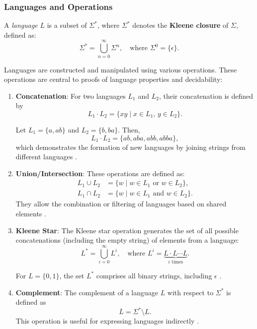 \subsubsection{Languages and Operations}
A \textit{language} $L$ is a subset of $\Sigma^\ast$, where $\Sigma^\ast$ denotes the \textbf{Kleene closure} of $\Sigma$, defined as:
\[
\Sigma^\ast = \bigcup_{n=0}^\infty \Sigma^n, \quad \text{where } \Sigma^0 = \{\epsilon\}.
\]
\cite{kleene1956representation}

Languages are constructed and manipulated using various operations. These operations are central to proofs of language properties and decidability:

\begin{enumerate}
    \item \textbf{Concatenation}: For two languages $L_1$ and $L_2$, their concatenation is defined by 
    \[
    L_1 \cdot L_2 = \{xy \mid x \in L_1,\, y \in L_2\}.
    \]
    \begin{example}
    Let $L_1 = \{a, ab\}$ and $L_2 = \{b, ba\}$. Then,
    \[
    L_1 \cdot L_2 = \{ab, aba, abb, abba\},
    \]
    which demonstrates the formation of new languages by joining strings from different languages \cite{sipser2013introduction}.
    \end{example}

    \item \textbf{Union/Intersection}: These operations are defined as:
    \begin{align*}
        L_1 \cup L_2 &= \{w \mid w \in L_1 \text{ or } w \in L_2\}, \\
        L_1 \cap L_2 &= \{w \mid w \in L_1 \text{ and } w \in L_2\}.
    \end{align*}
    They allow the combination or filtering of languages based on shared elements \cite{sipser2013introduction}.

    \item \textbf{Kleene Star}: The Kleene star operation generates the set of all possible concatenations (including the empty string) of elements from a language:
    \[
    L^\ast = \bigcup_{i=0}^\infty L^i, \quad \text{where } L^i = \underbrace{L \cdot L \cdots L}_{i \text{ times}}.
    \]
    \begin{example}
    For $L = \{0, 1\}$, the set $L^\ast$ comprises all binary strings, including $\epsilon$ \cite{sipser2013introduction}.
    \end{example}

    \item \textbf{Complement}: The complement of a language $L$ with respect to $\Sigma^\ast$ is defined as 
    \[
    \overline{L} = \Sigma^\ast \setminus L.
    \]
    This operation is useful for expressing languages indirectly \cite{sipser2013introduction}.


\end{enumerate}
